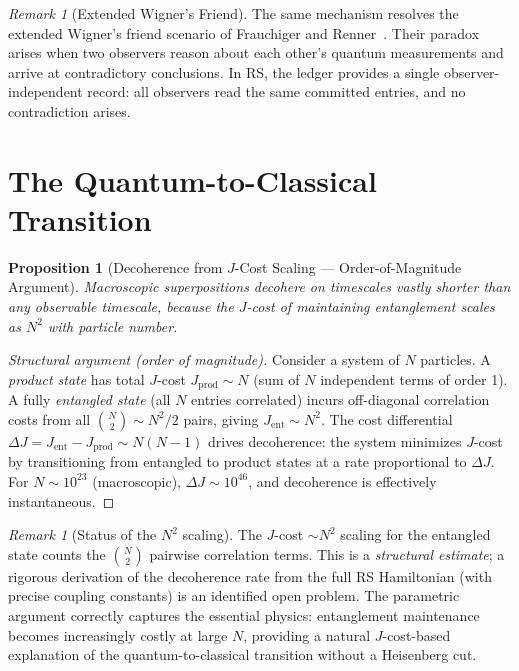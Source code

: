 \documentclass[12pt,a4paper]{article}
\newtheorem{proposition}[theorem]{Proposition}
\theoremstyle{definition}
\theoremstyle{remark}
\newtheorem{remark}[theorem]{Remark}
\begin{document}
\begin{remark}[Extended Wigner's Friend]
The same mechanism resolves the extended Wigner's friend
scenario of Frauchiger and Renner~\cite{FrauchigerRenner}.
Their paradox arises when two observers reason about each
other's quantum measurements and arrive at contradictory
conclusions.  In RS, the ledger provides a single
observer-independent record: all observers read the same
committed entries, and no contradiction arises.
\end{remark}

\section{The Quantum-to-Classical Transition}
\label{sec:decoherence}

\begin{proposition}[Decoherence from $J$-Cost Scaling --- Order-of-Magnitude Argument]
\label{prop:decoherence}
Macroscopic superpositions decohere on timescales vastly shorter
than any observable timescale, because the $J$-cost of maintaining
entanglement scales as $N^2$ with particle number.
\end{proposition}

\begin{proof}[Structural argument (order of magnitude)]
Consider a system of $N$ particles.  A \emph{product state}
has total $J$-cost $J_{\mathrm{prod}} \sim N$ (sum of $N$ independent
terms of order 1).  A fully \emph{entangled state} (all $N$ entries
correlated) incurs off-diagonal correlation costs from all $\binom{N}{2}
\sim N^2/2$ pairs, giving $J_{\mathrm{ent}} \sim N^2$.  The cost
differential $\Delta J = J_{\mathrm{ent}} - J_{\mathrm{prod}} \sim
N(N-1)$ drives decoherence: the system minimizes $J$-cost by
transitioning from entangled to product states at a rate
proportional to $\Delta J$.  For $N \sim 10^{23}$ (macroscopic),
$\Delta J \sim 10^{46}$, and decoherence is effectively instantaneous.
\end{proof}

\begin{remark}[Status of the $N^2$ scaling]
The $J$-cost $\sim N^2$ scaling for the entangled state counts
the $\binom{N}{2}$ pairwise correlation terms.  This is a
\emph{structural estimate}; a rigorous derivation of the decoherence
rate from the full RS Hamiltonian (with precise coupling constants)
is an identified open problem.  The parametric argument correctly
captures the essential physics: entanglement maintenance becomes
increasingly costly at large $N$, providing a natural $J$-cost-based
explanation of the quantum-to-classical transition without a
Heisenberg cut.
\end{remark}
\end{document}
